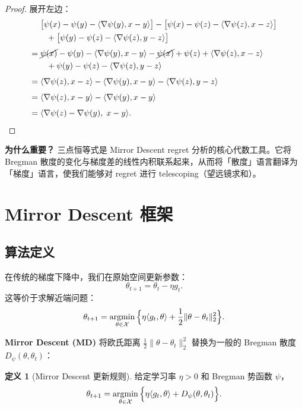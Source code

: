\documentclass[12pt,a4paper]{ctexart}
\theoremstyle{definition}
\newtheorem{definition}{定义}[section]
\theoremstyle{plain}
\theoremstyle{remark}
\newcommand{\cX}{\mathcal{X}}
\newcommand{\argmin}{\operatornamewithlimits{argmin}}
\begin{document}
\begin{proof}
展开左边：
\begin{align*}
  &\; \big[\psi(x) - \psi(y) - \langle\nabla\psi(y), x-y\rangle\big]
   - \big[\psi(x) - \psi(z) - \langle\nabla\psi(z), x-z\rangle\big] \\
  &\quad + \big[\psi(y) - \psi(z) - \langle\nabla\psi(z), y-z\rangle\big] \\[4pt]
  =&\; \cancel{\psi(x)} - \psi(y) - \langle\nabla\psi(y), x-y\rangle
   - \cancel{\psi(x)} + \psi(z) + \langle\nabla\psi(z), x-z\rangle \\
  &\quad + \psi(y) - \psi(z) - \langle\nabla\psi(z), y-z\rangle \\[4pt]
  =&\; \langle\nabla\psi(z), x - z\rangle - \langle\nabla\psi(y), x - y\rangle - \langle\nabla\psi(z), y - z\rangle \\[4pt]
  =&\; \langle\nabla\psi(z), x - y\rangle - \langle\nabla\psi(y), x - y\rangle \\[4pt]
  =&\; \langle \nabla\psi(z) - \nabla\psi(y),\; x - y \rangle.
\end{align*}
\end{proof}

\textbf{为什么重要？} 三点恒等式是 Mirror Descent regret 分析的核心代数工具。它将 Bregman 散度的变化与梯度差的线性内积联系起来，从而将「散度」语言翻译为「梯度」语言，使我们能够对 regret 进行 telescoping（望远镜求和）。

\section{Mirror Descent 框架}

\subsection{算法定义}

在传统的梯度下降中，我们在原始空间更新参数：
\[
  \theta_{t+1} = \theta_t - \eta g_t.
\]
这等价于求解近端问题：
\[
  \theta_{t+1}
  = \argmin_{\theta \in \cX} \Big\{
      \eta \langle g_t, \theta \rangle + \frac{1}{2}\|\theta - \theta_t\|_2^2
    \Big\}.
\]

\textbf{Mirror Descent (MD)} 将欧氏距离 $\frac{1}{2}\|\theta - \theta_t\|_2^2$ 替换为一般的 Bregman 散度 $D_\psi(\theta, \theta_t)$：

\begin{definition}[Mirror Descent 更新规则]
给定学习率 $\eta > 0$ 和 Bregman 势函数 $\psi$，
\begin{equation}\label{eq:md-update}
  \theta_{t+1}
  = \argmin_{\theta \in \cX} \Big\{
      \eta \langle g_t, \theta \rangle + D_\psi(\theta, \theta_t)
    \Big\}.
\end{equation}
\end{definition}
\end{document}
